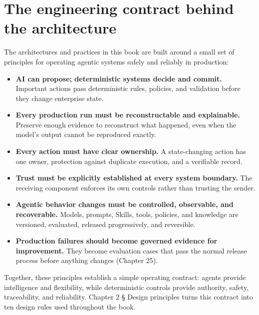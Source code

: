 
\section{The engineering contract behind the architecture}

The architectures and practices in this book are built around a small set of principles for operating agentic systems safely and reliably in production:\par

\begin{itemize}

\item \textbf{AI can propose; deterministic systems decide and commit.} Important actions pass deterministic rules, policies, and validation before they change enterprise state.

\item \textbf{Every production run must be reconstructable and explainable.} Preserve enough evidence to reconstruct what happened, even when the model's output cannot be reproduced exactly.

\item \textbf{Every action must have clear ownership.} A state-changing action has one owner, protection against duplicate execution, and a verifiable record.

\item \textbf{Trust must be explicitly established at every system boundary.} The receiving component enforces its own controls rather than trusting the sender.

\item \textbf{Agentic behavior changes must be controlled, observable, and recoverable.} Models, prompts, Skills, tools, policies, and knowledge are versioned, evaluated, released progressively, and reversible.

\item \textbf{Production failures should become governed evidence for improvement.} They become evaluation cases that pass the normal release process before anything changes (Chapter 25).

\end{itemize}

Together, these principles establish a simple operating contract: agents provide intelligence and flexibility, while deterministic controls provide authority, safety, traceability, and reliability. Chapter 2 § Design principles turns this contract into ten design rules used throughout the book.\par

